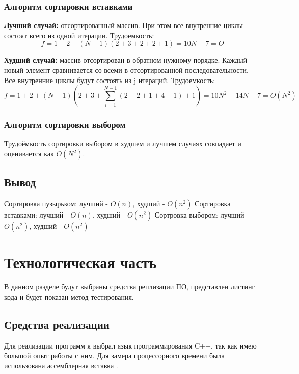 \documentclass[utf8x, 12pt]{G7-32}
\begin{document}
\subsection{Алгоритм сортировки вставками}
\hspace*{5mm}
\textbf{Лучший случай:} отсортированный массив. При этом все внутренние циклы состоят всего из одной итерации.\newline
Трудоемкость:
	\begin{equation}
                f = 1 + 2 + (N-1)(2 + 3 + 2 + 2 + 1) = 10N - 7 = O 
            \end{equation}

\textbf{Худший случай:} массив отсортирован в обратном нужному порядке. Каждый новый элемент сравнивается со всеми в отсортированной последовательности.
Все внутренние циклы будут состоять из j итераций. \newline
Трудоемкость: 
            \begin{equation}
                f = 1 + 2 + (N-1)(2 + 3 + \sum_{i=1}^{N-1} (2 + 2 + 1 + 4 + 1) + 1) = 10N^2 - 14N + 7 = O(N^2)
            \end{equation}

\subsection{Алгоритм сортировки выбором}
            Трудоёмкость сортировки выбором в худшем и лучшем случаях совпадает
            и оценивается как $ O(N^2) $.

\section{Вывод}
Сортировка пузырьком: лучший - $O(n)$, худший - $O(n^2)$ \newline
Сортировка вставками: лучший - $O(n)$, худший - $O(n^2)$ \newline
Сортровка выбором: лучший - $O(n^2)$, худший - $O(n^2)$ \newline




\chapter{Технологическая часть}
В данном разделе будут выбраны средства реплизации ПО, представлен листинг кода
и будет показан метод тестирования.
\section{Средства реализации}
Для реализации программ я выбрал язык программирования C++, так как имею большой опыт работы с ним.
Для замера процессорного времени была использована ассемблерная вставка \cite{link_time}.
\end{document}
